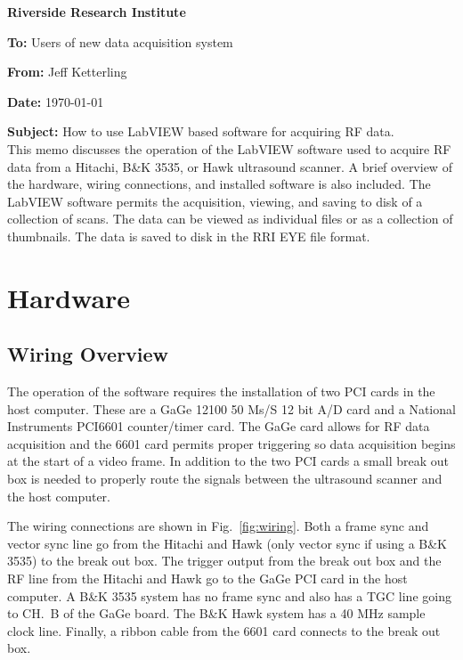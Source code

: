 \documentclass[10pt]{article}
\begin{document}
\begin{center}
 {\huge \bf Riverside Research Institute}
\end{center}

{\bf To:} Users of new data acquisition system

{\bf From:} Jeff Ketterling

{\bf Date:} \today

{\bf Subject:} How to use LabVIEW based software for acquiring RF
data.
\\

This memo discusses the operation of the LabVIEW software used to
acquire RF data from a Hitachi, B\&K 3535, or Hawk ultrasound
scanner. A brief overview of the hardware, wiring connections, and
installed software is also included. The LabVIEW software permits
the acquisition, viewing, and saving to disk of a collection of
scans. The data can be viewed as individual files or as a
collection of thumbnails. The data is saved to disk in the RRI EYE
file format.

\section{Hardware}

\subsection{Wiring Overview}

The operation of the software requires the installation of two PCI
cards in the host computer. These are a GaGe 12100 50 Ms/S 12 bit
A/D card and a National Instruments PCI6601 counter/timer card.
The GaGe card allows for RF data acquisition and the 6601 card
permits proper triggering so data acquisition begins at the start
of a video frame. In addition to the two PCI cards a small break
out box is needed to properly route the signals between the
ultrasound scanner and the host computer.

The wiring connections are shown in Fig.~\ref{fig:wiring}. Both a
frame sync and vector sync line go from the Hitachi and Hawk (only
vector sync if using a B\&K 3535) to the break out box. The
trigger output from the break out box and the RF line from the
Hitachi and Hawk go to the GaGe PCI card in the host computer. A
B\&K 3535 system has no frame sync and also has a TGC line going
to CH.~B of the GaGe board. The B\&K Hawk system has a 40 MHz
sample clock line. Finally, a ribbon cable from the 6601 card
connects to the break out box.
\end{document}
